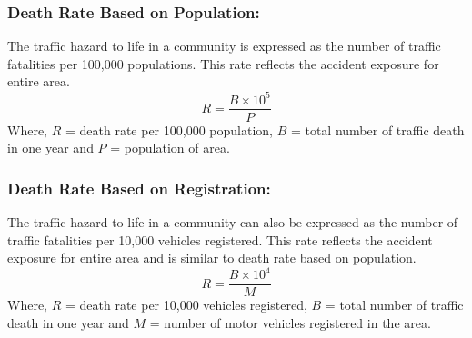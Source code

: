 \subsubsection{Death Rate Based on Population:}
The traffic hazard to life in a community is expressed as the number of traffic fatalities per 100,000 populations. This rate reflects the accident exposure for entire area.
\begin{equation}
	R = \frac{B \times 10^5}{P}
\end{equation}
Where, $ R $ = death rate per 100,000 population, $ B $ = total number of traffic death in one year and $ P $ = population of area.
\subsubsection{Death Rate Based on Registration:}
The traffic hazard to life in a community can also be expressed as the number of traffic fatalities per 10,000 vehicles registered. This rate reflects the accident exposure for entire area and is similar to death rate based on population.
\begin{equation}
	R = \frac{B \times 10^4}{M}
\end{equation}
Where, $ R $ = death rate per 10,000 vehicles registered, $ B $ = total number of traffic death in one year and $ M $ = number of motor vehicles registered in the area.
%
